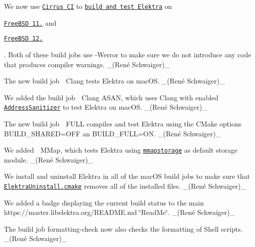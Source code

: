\begin{DoxyItemize}
\item We now use \href{https://cirrus-ci.com}{\tt Cirrus CI} to \href{http://cirrus-ci.com/github/ElektraInitiative/libelektra}{\tt build and test Elektra} on
\begin{DoxyItemize}
\item \href{https://www.freebsd.org/releases/11.2R/announce.html}{\tt Free\+B\+SD 11.} and
\item \href{https://www.freebsd.org/releases/12.0R/announce.html}{\tt Free\+B\+SD 12.}
\end{DoxyItemize}

. Both of these build jobs use {\ttfamily -\/\+Werror} to make sure we do not introduce any code that produces compiler warnings. \+\_\+(René Schwaiger)\+\_\+
\item The new build job {\ttfamily 🍎 Clang} tests Elektra on mac\+OS. \+\_\+(René Schwaiger)\+\_\+
\item We added the build job {\ttfamily 🍎 Clang A\+S\+AN}, which uses Clang with enabled \href{https://en.wikipedia.org/wiki/AddressSanitizer}{\tt Address\+Sanitizer} to test Elektra on mac\+OS. \+\_\+(René Schwaiger)\+\_\+
\item The new build job {\ttfamily 🍎 F\+U\+LL} compiles and test Elektra using the C\+Make options {\ttfamily B\+U\+I\+L\+D\+\_\+\+S\+H\+A\+R\+ED=O\+FF} an {\ttfamily B\+U\+I\+L\+D\+\_\+\+F\+U\+LL=ON}. \+\_\+(René Schwaiger)\+\_\+
\item We added {\ttfamily 🍎 M\+Map}, which tests Elektra using \href{https://www.libelektra.org/plugins/mmapstorage}{\tt {\ttfamily mmapstorage}} as default storage module. \+\_\+(René Schwaiger)\+\_\+
\item We install and uninstall Elektra in all of the mac\+OS build jobs to make sure that \href{https://master.libelektra.org/scripts/cmake/ElektraUninstall.cmake}{\tt {\ttfamily Elektra\+Uninstall.\+cmake}} removes all of the installed files. \+\_\+(René Schwaiger)\+\_\+
\end{DoxyItemize}


\begin{DoxyItemize}
\item We added a badge displaying the current build status to the main https\+://master.libelektra.\+org/\+R\+E\+A\+D\+ME.md \char`\"{}\+Read\+Me\char`\"{}. \+\_\+(René Schwaiger)\+\_\+
\item The build job {\ttfamily formatting-\/check} now also checks the formatting of Shell scripts. \+\_\+(René Schwaiger)\+\_\+
\end{DoxyItemize}


